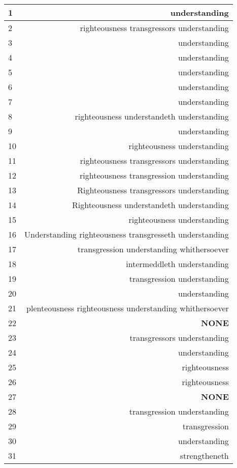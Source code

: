 \begin{center}
\begin{longtable}{l|r}
\hline \hline
\endlastfoot
1 & understanding \\ \hline
2 & righteousness transgressors understanding \\ \hline
3 & understanding \\ \hline
4 & understanding \\ \hline
5 & understanding \\ \hline
6 & understanding \\ \hline
7 & understanding \\ \hline
8 & righteousness understandeth understanding \\ \hline
9 & understanding \\ \hline
10 & righteousness understanding \\ \hline
11 & righteousness transgressors understanding \\ \hline
12 & righteousness transgression understanding \\ \hline
13 & Righteousness transgressors understanding \\ \hline
14 & Righteousness understandeth understanding \\ \hline
15 & righteousness understanding \\ \hline
16 & Understanding righteousness transgresseth understanding \\ \hline
17 & transgression understanding whithersoever \\ \hline
18 & intermeddleth understanding \\ \hline
19 & transgression understanding \\ \hline
20 & understanding \\ \hline
21 & plenteousness righteousness understanding whithersoever \\ \hline
22 & \textbf{\textcolor[rgb]{0.00,1.00,0.00}{NONE}}  \\ \hline
23 & transgressors understanding \\ \hline
24 & understanding \\ \hline
25 & righteousness \\ \hline
26 & righteousness \\ \hline
27 & \textbf{\textcolor[rgb]{0.00,1.00,0.00}{NONE}}  \\ \hline
28 & transgression understanding \\ \hline
29 & transgression \\ \hline
30 & understanding \\ \hline
31 & strengtheneth \\ \hline



\end{longtable}
\end{center}

